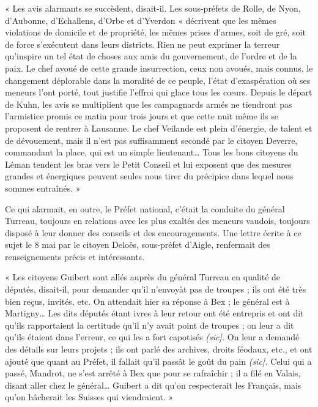 \documentclass[french,twoside]{book} %
\newenvironment{quoteblock}%
  {\begin{quoting}}
  {\end{quoting}}
\newenvironment{quotebar}{%
    \def\FrameCommand{{\color{rubric!10!}\vrule width 0.5em} \hspace{0.9em}}%
    \def\OuterFrameSep{\itemsep} %
    \MakeFramed {\advance\hsize-\width \FrameRestore}
  }%
  {%
    \endMakeFramed
  }
\renewenvironment{quoteblock}%
  {%
    \savenotes
    \setstretch{0.9}
    \begin{quotebar}
  }
  {%
    \end{quotebar}
    \spewnotes
  }
\begin{document}
\begin{quoteblock}
 \noindent « Les avis alarmants se succèdent, disait-il. Les sous-préfets de Rolle, de Nyon, d’Aubonne, d’Echallens, d’Orbe et d’Yverdon « décrivent que les mêmes violations de domicile et de propriété, les mêmes prises d’armes, soit de gré, soit de force s’exécutent dans leurs districts. Rien ne peut exprimer la terreur qu’inspire un tel état de choses aux amis du gouvernement, de l’ordre et de la paix. Le chef avoué de cette grande insurrection, ceux non avoués, mais connus, le changement déplorable dans la moralité de ce peuple, l’état d’exaspération où ses meneurs l’ont porté, tout justifie l’effroi qui glace tous les cœurs. Depuis le départ de Kuhn, les avis se multiplient que les campagnards armés ne tiendront pas l’armistice promis ce matin pour trois jours et que cette nuit même ils se proposent de rentrer à Lausanne. Le chef Veilande est plein d’énergie, de talent et de dévouement, mais il n’est pas suffisamment secondé par le citoyen Deverre, commandant la place, qui est un simple lieutenant… Tous les bons citoyens du Léman tendent les bras vers le Petit Conseil et lui exposent que des mesures grandes et énergiques peuvent seules nous tirer du précipice dans lequel nous sommes entraînés. »
 \end{quoteblock}

\noindent Ce qui alarmait, en outre, le Préfet national, c’était la conduite du général Turreau, toujours en relations avec les plus exaltés des meneurs vaudois, toujours disposé à leur donner des conseils et des encouragements. Une lettre écrite à ce sujet le 8 mai par le citoyen Deloës, sous-préfet d’Aigle, renfermait des renseignements précis et intéressants.\par

\begin{quoteblock}
 \noindent « Les citoyens Guibert sont allés auprès du général Turreau en qualité de députés, disait-il, pour demander qu’il n’envoyàt pas de troupes ; ils ont été très bien reçus, invités, etc. On attendait hier sa réponse à Bex ; le général est à Martigny… Les dits députés étant ivres à leur retour ont été entrepris et ont dit qu’ils rapportaient la certitude qu’il n’y avait point de troupes ; on leur a dit qu’ils étaient dans l’erreur, ce qui les a fort capotisés \emph{(sic].} On leur a demandé des détails sur leurs projets ; ils ont parlé des archives, droits féodaux, etc., et ont ajouté que quant au Préfet, il fallait qu’il passât le goût du pain \emph{(sic].} Celui qui a passé, Mandrot, ne s’est arrêté à Bex que pour se rafraîchir ; il a filé en Valais, disant aller chez le général… Guibert a dit qu’on respecterait les Français, mais qu’on hâcherait les Suisses qui viendraient. »
 \end{quoteblock}
\end{document}
